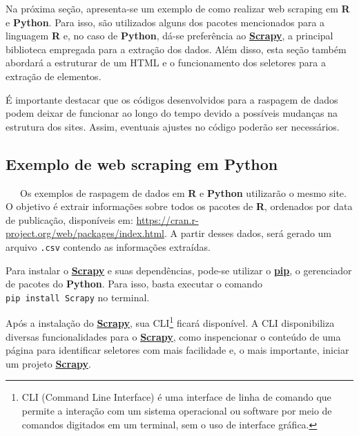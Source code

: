 \documentclass[
  12pt,
  a4paper,
]{scrreprt}
\begin{document}
Na próxima seção, apresenta-se um exemplo de como realizar web scraping
em \textbf{R} e \textbf{Python}. Para isso, são utilizados alguns dos
pacotes mencionados para a linguagem \textbf{R} e, no caso de
\textbf{Python}, dá-se preferência ao
\href{https://docs.scrapy.org/en/latest}{\textbf{Scrapy}}, a principal
biblioteca empregada para a extração dos dados. Além disso, esta seção
também abordará a estruturar de um HTML e o funcionamento dos seletores
para a extração de elementos.

\vspace{12pt}

É importante destacar que os códigos desenvolvidos para a raspagem de
dados podem deixar de funcionar ao longo do tempo devido a possíveis
mudanças na estrutura dos sites. Assim, eventuais ajustes no código
poderão ser necessários.

\subsection{Exemplo de web scraping em
Python}\label{exemplo-de-web-scraping-em-python}

~~~Os exemplos de raspagem de dados em \textbf{R} e \textbf{Python}
utilizarão o mesmo site. O objetivo é extrair informações sobre todos os
pacotes de \textbf{R}, ordenados por data de publicação, disponíveis em:
\url{https://cran.r-project.org/web/packages/index.html}. A partir
desses dados, será gerado um arquivo \texttt{.csv} contendo as
informações extraídas.

\vspace{12pt}

Para instalar o
\href{https://docs.scrapy.org/en/latest}{\textbf{Scrapy}} e suas
dependências, pode-se utilizar o
\href{https://pip.pypa.io/en/stable/}{\textbf{pip}}, o gerenciador de
pacotes do \textbf{Python}. Para isso, basta executar o comando
\texttt{pip\ install\ Scrapy} no terminal.

\vspace{12pt}

Após a instalação do
\href{https://docs.scrapy.org/en/latest}{\textbf{Scrapy}}, sua
CLI\footnote{CLI (Command Line Interface) é uma interface de linha de
  comando que permite a interação com um sistema operacional ou software
  por meio de comandos digitados em um terminal, sem o uso de interface
  gráfica.} ficará disponível. A CLI disponibiliza diversas
funcionalidades para o
\href{https://docs.scrapy.org/en/latest}{\textbf{Scrapy}}, como
inspencionar o conteúdo de uma página para identificar seletores com
mais facilidade e, o mais importante, iniciar um projeto
\href{https://docs.scrapy.org/en/latest}{\textbf{Scrapy}}.
\end{document}
